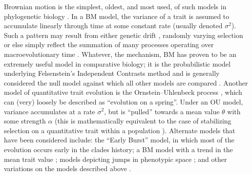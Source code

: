 \documentclass[a4paper,12pt]{article}
\begin{document}
Brownian motion is the simplest, oldest, and most used, of such models in phylogenetic biology  \citep[BM;][]{Edwards1964, Felsenstein1973, Thompson1975}. In a BM model, the variance of a trait is assumed to accumulate linearly through time at some constant rate (usually denoted $\sigma^2$). Such a pattern may result from either genetic drift \citep{Lande1976, HansenMartins1996}, randomly varying selection \citep{Felsenstein1973, Felsenstein1988} or else simply reflect the summation of many processes operating over macroevolutionary time \citep{HansenMartins1996, Uyeda2011, PennellHarmon, PennellPE}. Whatever, the mechanism, BM has proven to be an extremely useful model in comparative biology; it is the probabilistic model underlying Felsenstein's Independent Contrasts method \citep[][see below]{Felsenstein1985} and is generally considered the null model against which all other models are compared \citep{Blomberg2003}. %
Another model of quantitative trait evolution is the Ornstein--Uhlenbeck process \citep[OU;][]{Felsenstein1988, Hansen1997}, which can (very) loosely be described as ``evolution on a spring''. Under an OU model, variance accumulates at a rate $\sigma^2$, but is ``pulled'' towards a mean value $\theta$ with some strength $\alpha$ (this is mathematically equivalent to the case of stabilizing selection on a quantitative trait within a population \citep{Lande1976}). %
Alternate models that have been considered include: the ``Early Burst'' \citep[EB;][]{Blomberg2003, Harmon2010, SlaterPennell} model, in which most of the evolution occurs early in the clades history; a BM model with a trend in the mean trait value \citep{Hunt2006}; models depicting jumps in phenotypic space \citep{Landis2012, Eastmanlevy}; and other variations on the models described above \citep[e.g.][]{Pagel1997, Pagel1999, ButlerKing2004, Omeara2006, Eastman2011, Beaulieu2012, SlaterMEE}. 
\end{document}
